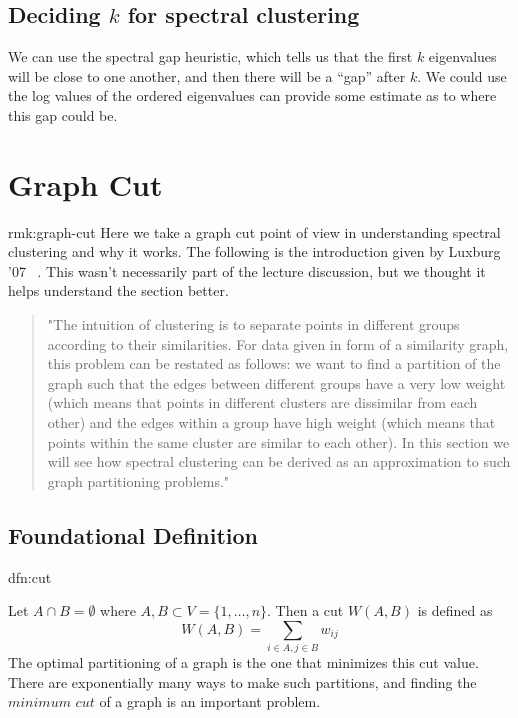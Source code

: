 \documentclass[12pt]{article}
\theoremstyle{plain}
\begin{document}
\subsection{Deciding $ k $ for spectral clustering}

We can use the spectral gap heuristic, which tells us that the first $ k $ eigenvalues will be close to one another, and then there will be a ``gap'' after $ k $.
We could use the log values of the ordered eigenvalues can provide some estimate as to where this gap could be.

\section{Graph Cut}

\begin{rmk}{rmk:graph-cut}
Here we take a graph cut point of view in understanding spectral clustering and why it works. The following is the introduction given by Luxburg '07 ~\cite{luxburg-2007}. This wasn't necessarily part of the lecture discussion, but we thought it helps understand the section better.
\end{rmk}

\begin{quote}
"The intuition of clustering is to separate points in different groups according to their similarities. For data given in form of a similarity graph, this problem can be restated as follows: we want to find a partition of the graph such that the edges between different groups have a very low weight (which means that points in different clusters are dissimilar from each other) and the edges within a group have high weight (which means that points within the same cluster are similar to each other). In this section we will see how spectral clustering can be derived as an approximation to such graph partitioning problems."~\cite{luxburg-2007}
\end{quote}

\subsection{Foundational Definition}

\begin{dfn}[Cut]{dfn:cut}

Let $ A \cap B = \emptyset $ where $ A, B \subset V = \{ 1, \ldots, n \} $.  
Then a cut $ W(A, B) $ is defined as
\[
W(A, B) = \sum_{i \in A, j \in B} w_{ij}
\]
The optimal partitioning of a graph is the one that minimizes this cut value. There are exponentially many ways to make such partitions, and finding the $\textit{minimum cut}$ of a graph is an important problem. 
\end{dfn}
\end{document}
